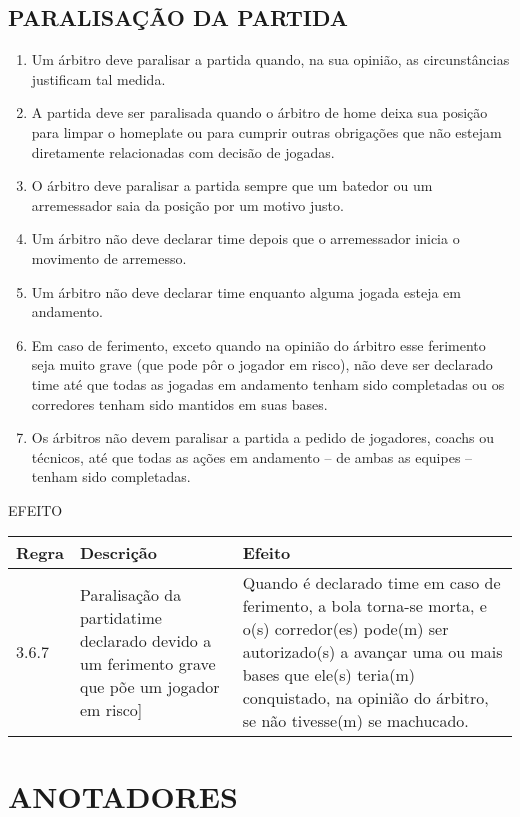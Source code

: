 \subsection{PARALISAÇÃO DA PARTIDA}
\begin{enumerate}[label=(\alph*)]
	\item Um árbitro deve paralisar a partida quando, na sua opinião, as circunstâncias justificam tal medida.
	\item A partida deve ser paralisada quando o árbitro de \gls{home} deixa sua posição	para limpar o \gls{homeplate} ou para cumprir outras obrigações que não estejam diretamente relacionadas com decisão de jogadas.
	\item  O árbitro deve paralisar a partida sempre que um batedor ou um arremessador saia da posição por um motivo justo.
	\item  Um árbitro não deve declarar \gls{time} depois que o arremessador inicia o movimento de arremesso.
	\item  Um árbitro não deve declarar \gls{time} enquanto alguma jogada esteja em  andamento.
	\item  Em caso de ferimento, exceto quando na opinião do árbitro esse ferimento seja muito grave (que pode pôr o jogador em risco), não deve ser declarado \gls{time} até que todas as jogadas em andamento tenham sido completadas ou os corredores tenham sido mantidos em suas bases.
	\item   Os árbitros não devem paralisar a partida a pedido de jogadores, \glspl{coach}
	ou técnicos, até que todas as ações em andamento -- de ambas as equipes --
	tenham sido completadas.
\end{enumerate}

EFEITO

{\footnotesize\begin{tabular}{p{20mm}p{50mm}p{90mm}}
		Regra& Descrição & Efeito\\\hline 3.6.7 & Paralisação da partida\gls{time} declarado devido a um ferimento grave que põe um jogador em risco] & Quando é declarado \gls{time} em caso de ferimento, a bola torna-se morta, e o(s) corredor(es) pode(m) ser autorizado(s) a avançar uma ou mais bases que ele(s) teria(m) conquistado, na opinião do árbitro, se não tivesse(m) se machucado.
		\\\end{tabular}}

\section{ANOTADORES}

